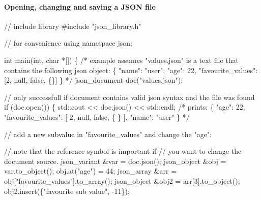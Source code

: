 \paragraph*{\label{_opening_changing_section}%
Opening, changing and saving a J\+S\+ON file}


\begin{DoxyCode}
\textcolor{comment}{// include library}
\textcolor{preprocessor}{#include "json\_library.h"}

\textcolor{comment}{// for convenience}
\textcolor{keyword}{using namespace }json;

\textcolor{keywordtype}{int} main(\textcolor{keywordtype}{int}, \textcolor{keywordtype}{char} *[]) \{
    \textcolor{comment}{/*}
\textcolor{comment}{    example assumes "values.json" is a text file that contains the following json object:}
\textcolor{comment}{    \{}
\textcolor{comment}{        "name": "user",}
\textcolor{comment}{        "age": 22,}
\textcolor{comment}{        "favourite\_values": [2, null, false, \{\}]}
\textcolor{comment}{    \}}
\textcolor{comment}{    */}
    json\_document doc(\textcolor{stringliteral}{"values.json"});

    \textcolor{comment}{// only successfull if document contains valid json syntax and the file was found}
    \textcolor{keywordflow}{if} (doc.open()) \{ 
        std::cout << doc.json() << std::endl;
        \textcolor{comment}{/*}
\textcolor{comment}{        prints:}
\textcolor{comment}{        \{}
\textcolor{comment}{            "age": 22,}
\textcolor{comment}{            "favourite\_values": [}
\textcolor{comment}{                2,}
\textcolor{comment}{                null,}
\textcolor{comment}{                false,}
\textcolor{comment}{                \{}
\textcolor{comment}{}
\textcolor{comment}{                \}}
\textcolor{comment}{            ],}
\textcolor{comment}{            "name": "user"}
\textcolor{comment}{        \}}
\textcolor{comment}{        */}

        \textcolor{comment}{// add a new subvalue in "favourite\_values" and change the "age":}

        \textcolor{comment}{// note that the reference symbol is important if }
        \textcolor{comment}{// you want to change the document source.}
        json\_variant &var = doc.json();
        json\_object &obj = var.to\_object();
        obj.at(\textcolor{stringliteral}{"age"}) = 44;
        json\_array &arr = obj[\textcolor{stringliteral}{"favourite\_values"}].to\_array();
        json\_object &obj2 = arr[3].to\_object();
        obj2.insert(\{\textcolor{stringliteral}{"favourite sub value"}, -11\});


\end{DoxyCode}
